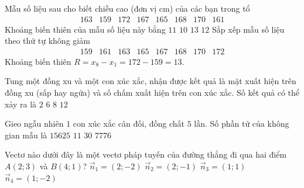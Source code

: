 \begin{ex}%
Mẫu số liệu sau cho biết chiều cao (đơn vị cm) của các bạn trong tổ
\[\begin{array}{llllllll}163 & 159 & 172 & 167 & 165 & 168 & 170 & 161\end{array}\]
Khoảng biến thiên của mẫu số liệu này bằng
\choice
{$11$}
{$10$}
{\True $13$}
{$12$}
\loigiai
{
Sắp xếp mẫu số liệu theo thứ tự không giảm
\[
\begin{array}{llllllll}
159 & 161 & 163 & 165 & 167 & 168 & 170 & 172
\end{array}
\]
Khoảng biến thiên $R=x_8-x_1=172-159=13$.
}
\end{ex}

\begin{ex}%
Tung một đồng xu và một con xúc xắc, nhận được kết quả là mặt xuất hiện trên đồng xu (sấp hay ngửa) và số chấm xuất hiện trên con xúc xắc. Số kết quả có thể xảy ra là
\choice
{$2$}
{$6$}
{$8$}
{\True $12$}
\end{ex}

\begin{ex}%
Gieo ngẫu nhiên $1$ con xúc xắc cân đối, đồng chất $5$ lần. Số phần tử của không gian mẫu là
\choice
{$15625$}
{$11$}
{$30$}
{\True$7776$}
\end{ex}

\begin{ex}%
Vectơ nào dưới đây là một vectơ pháp tuyến của đường thẳng đi qua hai điểm $A(2;3)$ và $B(4;1)$?
\choice
{ $\overrightarrow{n}_{1}=(2;-2)$}
{$\overrightarrow{n}_{2}=(2;-1)$}
{\True$\overrightarrow{n}_{3}=(1;1)$}
{$\overrightarrow{n}_{4}=(1;-2)$}
\end{ex}

